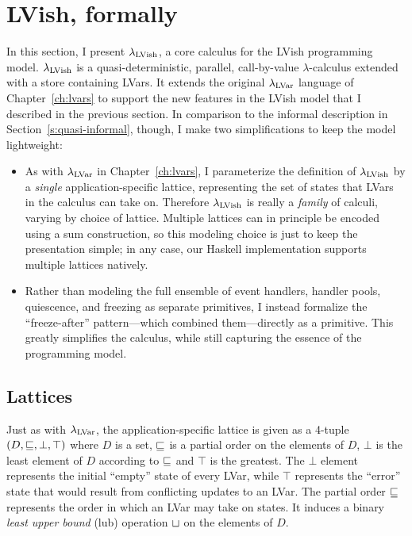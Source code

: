\section{LVish, formally}\label{s:quasi-formal}

In this section, I present $\lambda_{\textrm{LVish}}$, a core calculus for the
LVish programming model. $\lambda_{\textrm{LVish}}$ is a quasi-deterministic,
parallel, call-by-value $\lambda$-calculus extended with a store
containing LVars.  It extends the original $\lambda_{\textrm{LVar}}$ language of
Chapter~\ref{ch:lvars} to support the new features in the LVish model
that I described in the previous section.  In comparison to the
informal description in Section~\ref{s:quasi-informal}, though, I make
two simplifications to keep the model lightweight:
\begin{itemize}
\item As with $\lambda_{\textrm{LVar}}$ in Chapter~\ref{ch:lvars}, I parameterize
  the definition of $\lambda_{\textrm{LVish}}$ by a \emph{single}
  application-specific lattice, representing the set of states that
  LVars in the calculus can take on. Therefore $\lambda_{\textrm{LVish}}$ is
  really a \emph{family} of calculi, varying by choice of lattice.
  Multiple lattices can in principle be encoded using a sum
  construction, so this modeling choice is just to keep the
  presentation simple; in any case, our Haskell implementation
  supports multiple lattices natively.
\item Rather than modeling the full ensemble of event handlers,
  handler pools, quiescence, and freezing as separate primitives, I
  instead formalize the ``freeze-after'' pattern---which combined
  them---directly as a primitive.  This greatly simplifies the
  calculus, while still capturing the essence of the programming
  model.
\end{itemize}

\subsection{Lattices}

Just as with $\lambda_{\textrm{LVar}}$, the application-specific lattice is given
as a 4-tuple $(D, \sqsubseteq, \bot, \top)$ where $D$ is a set,
$\sqsubseteq$ is a partial order on the elements of $D$, $\bot$ is the
least element of $D$ according to $\sqsubseteq$ and $\top$ is the
greatest.  The $\bot$ element represents the initial ``empty'' state
of every LVar, while $\top$ represents the ``error'' state that would
result from conflicting updates to an LVar.  The partial order
$\sqsubseteq$ represents the order in which an LVar may take on states.
It induces a binary \emph{least upper bound} (lub) operation
$ \sqcup $ on the elements of $D$.

